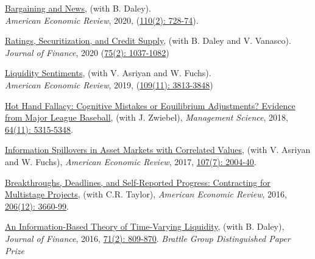 \documentclass[margin,line,11pt]{resume}
\begin{document}
\begin{resume}
    \href{http://papers.ssrn.com/sol3/papers.cfm?abstract_id=2767147}{Bargaining and News}, (with B. Daley). \\
\emph{American Economic Review}, 2020, (\href{https://www.aeaweb.org/articles?id=10.1257/aer.20181316&&from=f}{110(2): 728-74}).

  \href{https://papers.ssrn.com/sol3/papers.cfm?abstract_id=2937297}{Ratings, Securitization, and Credit Supply}, (with B. Daley and V. Vanasco).\\
  \emph{Journal of Finance}, 2020 (\href{https://onlinelibrary.wiley.com/doi/full/10.1111/jofi.12866}{75(2): 1037-1082})

    \href{https://papers.ssrn.com/sol3/papers.cfm?abstract_id=3100751}{Liquidity Sentiments}, (with V. Asriyan and W. Fuchs). \\
\emph{American Economic Review}, 2019, (\href{https://pubs.aeaweb.org/doi/pdfplus/10.1257/aer.20180998}{109(11): 3813-3848})

   
\href{http://papers.ssrn.com/sol3/papers.cfm?abstract_id=2358747}{Hot Hand Fallacy: Cognitive Mistakes or Equilibrium Adjustments? Evidence from Major League Baseball}, (with J. Zwiebel), \emph{Management Science}, 2018, \href{http://pubsonline.informs.org/doi/10.1287/mnsc.2017.2804}{64(11): 5315-5348}.
   
\href{http://papers.ssrn.com/sol3/papers.cfm?abstract_id=2565944}{Information Spillovers in Asset Markets with Correlated Values}, (with V. Asriyan and W. Fuchs), \emph{American Economic Review}, 2017, \href{https://www.aeaweb.org/articles?id=10.1257/aer.20151714}{107(7): 2004-40}.

    \href{http://papers.ssrn.com/sol3/papers.cfm?abstract_id=2579730}{Breakthroughs, Deadlines, and Self-Reported Progress: Contracting for Multistage Projects}, (with C.R. Taylor), \emph{American Economic Review}, 2016, \href{https://www.aeaweb.org/articles?id=10.1257/aer.20151181}{206(12): 3660-99}.

    \href{http://papers.ssrn.com/sol3/papers.cfm?abstract_id=2279752}{An Information-Based Theory of Time-Varying Liquidity}, (with B. Daley), \emph{Journal of Finance}, 2016, \href{https://onlinelibrary.wiley.com/doi/full/10.1111/jofi.12272}{71(2): 809-870}. \emph{Brattle Group Distinguished Paper Prize}






\end{resume}
\end{document}
